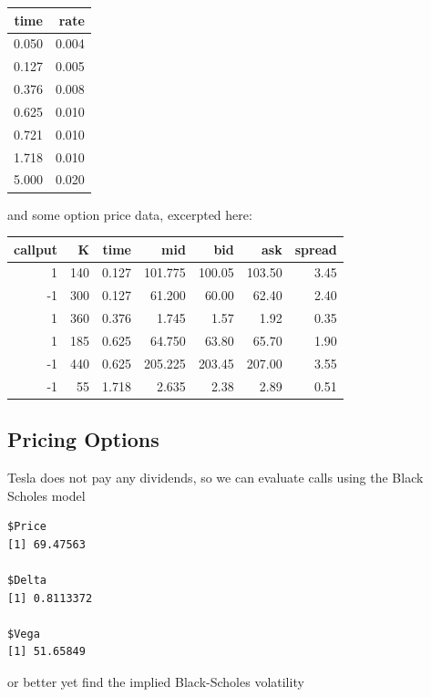 \documentclass[]{article}
\newenvironment{Shaded}{\begin{snugshade}}{\end{snugshade}}
\newcommand{\KeywordTok}[1]{\textcolor[rgb]{0.13,0.29,0.53}{\textbf{#1}}}
\newcommand{\DataTypeTok}[1]{\textcolor[rgb]{0.13,0.29,0.53}{#1}}
\newcommand{\DecValTok}[1]{\textcolor[rgb]{0.00,0.00,0.81}{#1}}
\newcommand{\FloatTok}[1]{\textcolor[rgb]{0.00,0.00,0.81}{#1}}
\newcommand{\StringTok}[1]{\textcolor[rgb]{0.31,0.60,0.02}{#1}}
\newcommand{\OperatorTok}[1]{\textcolor[rgb]{0.81,0.36,0.00}{\textbf{#1}}}
\newcommand{\NormalTok}[1]{#1}
\begin{document}
\begin{longtable}[]{@{}rr@{}}
\toprule
time & rate\tabularnewline
\midrule
\endhead
0.050 & 0.004\tabularnewline
0.127 & 0.005\tabularnewline
0.376 & 0.008\tabularnewline
0.625 & 0.010\tabularnewline
0.721 & 0.010\tabularnewline
1.718 & 0.010\tabularnewline
5.000 & 0.020\tabularnewline
\bottomrule
\end{longtable}

and some option price data, excerpted here:

\begin{longtable}[]{@{}rrrrrrr@{}}
\toprule
callput & K & time & mid & bid & ask & spread\tabularnewline
\midrule
\endhead
1 & 140 & 0.127 & 101.775 & 100.05 & 103.50 & 3.45\tabularnewline
-1 & 300 & 0.127 & 61.200 & 60.00 & 62.40 & 2.40\tabularnewline
1 & 360 & 0.376 & 1.745 & 1.57 & 1.92 & 0.35\tabularnewline
1 & 185 & 0.625 & 64.750 & 63.80 & 65.70 & 1.90\tabularnewline
-1 & 440 & 0.625 & 205.225 & 203.45 & 207.00 & 3.55\tabularnewline
-1 & 55 & 1.718 & 2.635 & 2.38 & 2.89 & 0.51\tabularnewline
\bottomrule
\end{longtable}

\subsection{Pricing Options}\label{pricing-options}

Tesla does not pay any dividends, so we can evaluate calls using the
Black Scholes model

\begin{verbatim}
$Price
[1] 69.47563

$Delta
[1] 0.8113372

$Vega
[1] 51.65849
\end{verbatim}

or better yet find the implied Black-Scholes volatility

\begin{Shaded}
\end{Shaded}
\end{document}
